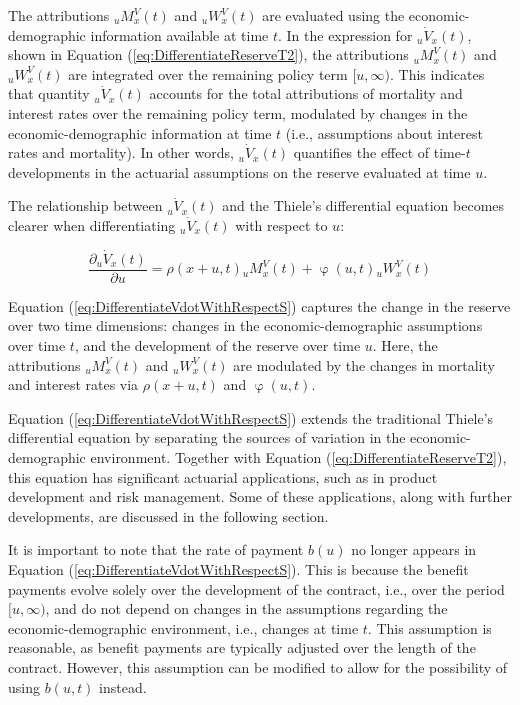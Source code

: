 \documentclass[12pt]{article}
\begin{document}
{The attributions ${}_uM^V_x(t)$ and ${}_uW^V_x(t)$ are evaluated using the economic-demographic information available at time \( t \). In the expression for ${}_u\dot{V}_x(t)$, shown in Equation (\ref{eq:DifferentiateReserveT2}), the attributions ${}_uM^V_x(t)$ and ${}_uW^V_x(t)$ are integrated over the remaining policy term \( [u, \infty) \). This indicates that quantity ${}_u\dot{V}_x(t)$ accounts for the total attributions of mortality and interest rates over the remaining policy term, modulated by changes in the economic-demographic information at time \( t \) (i.e., assumptions about interest rates and mortality). In other words, ${}_u\dot{V}_x(t)$ quantifies the effect of time-\( t \) developments in the actuarial assumptions on the reserve evaluated at time \( u \).

 
The relationship between ${}_u\dot{V}_x(t)$ and the Thiele's differential equation becomes clearer when differentiating ${}_u\dot{V}_x(t)$ with respect to $u$: 

\begin{equation}\label{eq:DifferentiateVdotWithRespectS}
\dfrac{\partial	{}_u\dot{V}_x(t)}{\partial u}= \rho(x+u,t) {}_uM^V_x(t)+ \upvarphi(u,t) {}_uW^V_x(t)
\end{equation}

Equation (\ref{eq:DifferentiateVdotWithRespectS}) captures the change in the reserve over two time dimensions: changes in the economic-demographic assumptions over time \( t \), and the development of the reserve over time \( u \). Here, the attributions \( {}_uM^V_x(t) \) and \( {}_uW^V_x(t) \) are modulated by the changes in mortality and interest rates via \( \rho(x+u,t) \) and \( \upvarphi(u,t) \).

Equation (\ref{eq:DifferentiateVdotWithRespectS}) extends the traditional Thiele’s differential equation by separating the sources of variation in the economic-demographic environment. Together with Equation (\ref{eq:DifferentiateReserveT2}), this equation has significant actuarial applications, such as in product development and risk management. Some of these applications, along with further developments, are discussed in the following section.

It is important to note that the rate of payment \( b(u) \) no longer appears in Equation (\ref{eq:DifferentiateVdotWithRespectS}). This is because the benefit payments evolve solely over the development of the contract, i.e., over the period \( [u, \infty) \), and do not depend on changes in the assumptions regarding the economic-demographic environment, i.e., changes at time \( t \). This assumption is reasonable, as benefit payments are typically adjusted over the length of the contract. However, this assumption can be modified to allow for the possibility of using \( b(u,t) \) instead.

}
\end{document}
